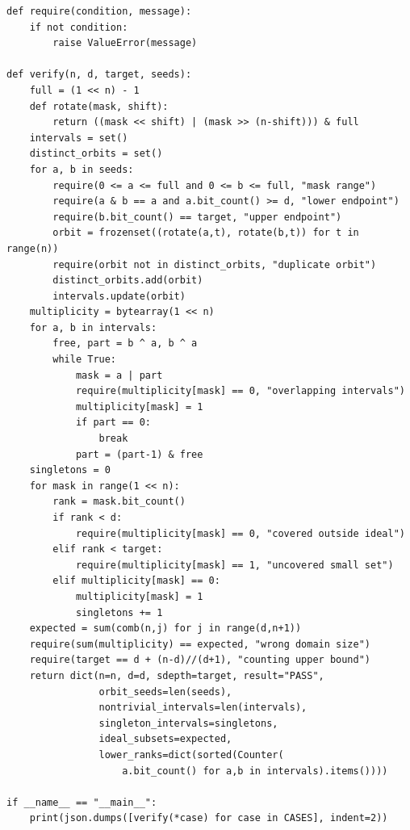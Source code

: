 \documentclass[11pt,a4paper]{article}
\begin{document}
\begin{lstlisting}
def require(condition, message):
    if not condition:
        raise ValueError(message)

def verify(n, d, target, seeds):
    full = (1 << n) - 1
    def rotate(mask, shift):
        return ((mask << shift) | (mask >> (n-shift))) & full
    intervals = set()
    distinct_orbits = set()
    for a, b in seeds:
        require(0 <= a <= full and 0 <= b <= full, "mask range")
        require(a & b == a and a.bit_count() >= d, "lower endpoint")
        require(b.bit_count() == target, "upper endpoint")
        orbit = frozenset((rotate(a,t), rotate(b,t)) for t in range(n))
        require(orbit not in distinct_orbits, "duplicate orbit")
        distinct_orbits.add(orbit)
        intervals.update(orbit)
    multiplicity = bytearray(1 << n)
    for a, b in intervals:
        free, part = b ^ a, b ^ a
        while True:
            mask = a | part
            require(multiplicity[mask] == 0, "overlapping intervals")
            multiplicity[mask] = 1
            if part == 0:
                break
            part = (part-1) & free
    singletons = 0
    for mask in range(1 << n):
        rank = mask.bit_count()
        if rank < d:
            require(multiplicity[mask] == 0, "covered outside ideal")
        elif rank < target:
            require(multiplicity[mask] == 1, "uncovered small set")
        elif multiplicity[mask] == 0:
            multiplicity[mask] = 1
            singletons += 1
    expected = sum(comb(n,j) for j in range(d,n+1))
    require(sum(multiplicity) == expected, "wrong domain size")
    require(target == d + (n-d)//(d+1), "counting upper bound")
    return dict(n=n, d=d, sdepth=target, result="PASS",
                orbit_seeds=len(seeds),
                nontrivial_intervals=len(intervals),
                singleton_intervals=singletons,
                ideal_subsets=expected,
                lower_ranks=dict(sorted(Counter(
                    a.bit_count() for a,b in intervals).items())))

if __name__ == "__main__":
    print(json.dumps([verify(*case) for case in CASES], indent=2))

\end{lstlisting}
\end{document}
